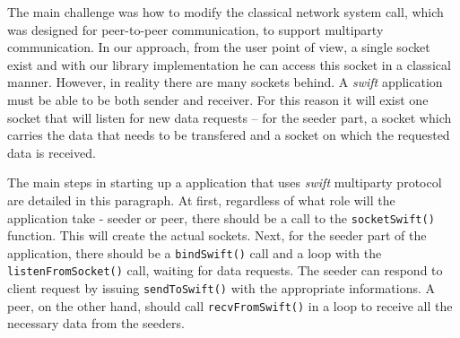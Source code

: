 The main challenge was how to modify the classical network system call, which was designed for peer-to-peer
communication, to support multiparty communication. In our approach, from the user point of view, a single socket
exist and with our library implementation he can access this socket in a classical manner. However, in reality there
are many sockets behind. A \emph{swift} application must be able to be both sender and receiver. For this reason
it will exist one socket that will listen for new data requests -- for the seeder part, a socket which carries the data
that needs to be transfered and a socket on which the requested data is received.

The main steps in starting up a application that uses \emph{swift} multiparty protocol are detailed in this paragraph.
At first, regardless of what role will the application take - seeder or peer, there should be a call to the
\texttt{socketSwift()} function. This will create the actual sockets. Next, for the seeder part of the application,
there should be a \texttt{bindSwift()} call and a loop with the \texttt{listenFromSocket()} call, waiting for data
requests. The seeder can respond to client request by issuing \texttt{sendToSwift()} with the appropriate informations.
A peer, on the other hand, should call \texttt{recvFromSwift()} in a loop to receive all the necessary data
from the seeders. 